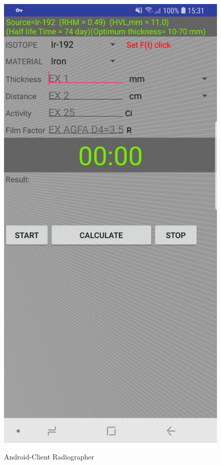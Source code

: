 \begin{figure}[htb]
         \includegraphics[scale=0.2]{img/soft/time.jpeg}\\
         
         
  \caption{Android-Client Radiographer}
  \label{sec:rg}
\end{figure}

